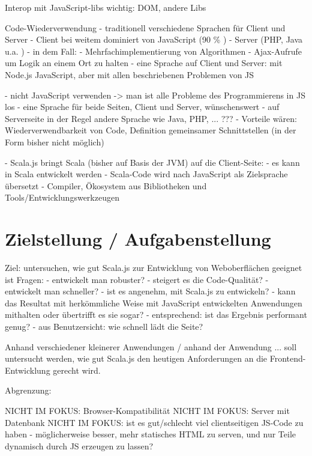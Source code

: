 \documentclass[a4paper, 12pt, hidelinks, listof=totoc, listoftables=totoc, bibliography=totoc]{scrreprt}
\begin{document}
Interop mit JavaScript-libs wichtig: DOM, andere Libs
\cite[S. 1]{doeraene2013.TDI}





Code-Wiederverwendung
- traditionell verschiedene Sprachen für Client und Server
	- Client bei weitem dominiert von JavaScript (90 \% \cite{w3techs.CLI})
	- Server (PHP, Java u.a. \cite{w3techs.SRV})
- in dem Fall:
	- Mehrfachimplementierung von Algorithmen
	- Ajax-Aufrufe um Logik an einem Ort zu halten
- eine Sprache auf Client und Server: mit Node.js JavaScript, aber mit allen beschriebenen Problemen von JS








- nicht JavaScript verwenden -> man ist alle Probleme des Programmierens in JS los
- eine Sprache für beide Seiten, Client und Server, wünschenswert
  - auf Serverseite in der Regel andere Sprache wie Java, PHP, ... ???
  - Vorteile wären: Wiederverwendbarkeit von Code, Definition gemeinsamer Schnittstellen (in der Form bisher nicht möglich)

- Scala.js bringt Scala (bisher auf Basis der JVM) auf die Client-Seite:
  - es kann in Scala entwickelt werden
  - Scala-Code wird nach JavaScript als Zielsprache übersetzt
  - Compiler, Ökosystem aus Bibliotheken und Tools/Entwicklungswerkzeugen



\section{Zielstellung / Aufgabenstellung}

Ziel: untersuchen, wie gut Scala.js zur Entwicklung von Weboberflächen geeignet ist
Fragen:
  - entwickelt man robuster?
  - steigert es die Code-Qualität?
  - entwickelt man schneller?
  - ist es angenehm, mit Scala.js zu entwickeln?
  - kann das Resultat mit herkömmliche Weise mit JavaScript entwickelten Anwendungen mithalten oder übertrifft es sie sogar?
  - entsprechend: ist das Ergebnis performant genug?
  - aus Benutzersicht: wie schnell lädt die Seite?

Anhand verschiedener kleinerer Anwendungen / anhand der Anwendung ... soll untersucht werden, wie gut Scala.js den heutigen Anforderungen an die Frontend-Entwicklung gerecht wird.


Abgrenzung:

	NICHT IM FOKUS: Browser-Kompatibilität
	NICHT IM FOKUS: Server mit Datenbank
	NICHT IM FOKUS:  ist es gut/schlecht viel clientseitigen JS-Code zu haben - möglicherweise besser, mehr statisches HTML zu serven, und nur Teile dynamisch durch JS erzeugen zu lassen?
\end{document}
